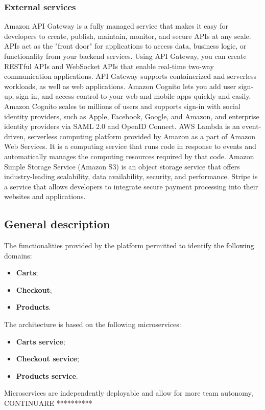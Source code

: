 \subsubsection{External services}
Amazon API Gateway is a fully managed service that makes it easy for developers to create, publish, maintain, monitor,
and secure APIs at any scale. APIs act as the "front door" for applications to access data, business logic,
or functionality from your backend services. Using API Gateway, you can create RESTful APIs and WebSocket APIs that
enable real-time two-way communication applications. API Gateway supports containerized and serverless workloads,
as well as web applications.
Amazon Cognito lets you add user sign-up, sign-in, and access control to your web and mobile apps quickly and easily.
Amazon Cognito scales to millions of users and supports sign-in with social identity providers, such as Apple,
Facebook, Google, and Amazon, and enterprise identity providers via SAML 2.0 and OpenID Connect.
AWS Lambda is an event-driven, serverless computing platform provided by Amazon as a part of Amazon Web Services.
It is a computing service that runs code in response to events and automatically manages the computing resources required by that code.
Amazon Simple Storage Service (Amazon S3) is an object storage service that offers industry-leading scalability,
data availability, security, and performance.
Stripe is a service that allows developers to integrate secure payment processing into their websites and applications.
\subsection{General description}
The functionalities provided by the platform permitted to identify the following domains:
\begin{itemize}
    \item \textbf{Carts};
    \item \textbf{Checkout};
    \item \textbf{Products}.
\end{itemize}
The architecture is based on the following microservices:
\begin{itemize}
    \item \textbf{Carts service};
    \item \textbf{Checkout service};
    \item \textbf{Products service}.
\end{itemize}
Microservices are independently deployable and allow for more team autonomy, CONTINUARE **********


